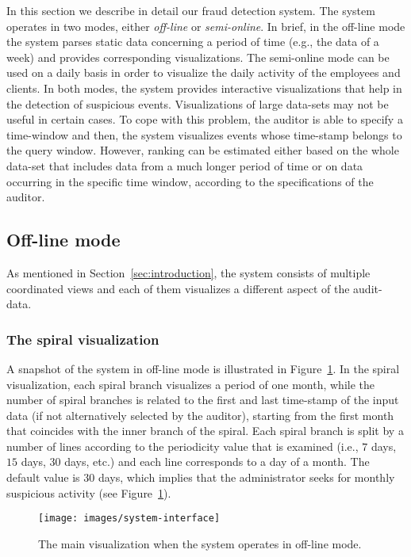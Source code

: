 \documentclass[conference]{IEEEtran}
\begin{document}
In this section we describe in detail our fraud detection system.
The system operates in two modes, either \emph{off-line} or
\emph{semi-online}. In brief, in the off-line mode the system parses
static data concerning a period of time (e.g., the data of a week)
and provides corresponding visualizations. The semi-online mode can
be used on a daily basis in order to visualize the daily activity of
the employees and clients. In both modes, the system provides
interactive visualizations that help in the detection of suspicious
events. Visualizations of large data-sets may not be useful in
certain cases. To cope with this problem, the auditor is able to
specify a time-window and then, the system visualizes events whose
time-stamp belongs to the query window. However, ranking can be
estimated either based on the whole data-set that includes data from
a much longer  period of time or on data occurring in the specific
time window, according to the specifications of the auditor.

\subsection{Off-line mode}

As mentioned in Section~\ref{sec:introduction}, the system consists
of multiple coordinated views and each of them visualizes a
different aspect of the audit-data.

\subsubsection{The spiral visualization}

A snapshot of the system in off-line mode is illustrated in
Figure~\ref{fig:system-interface}. In the spiral visualization, each
spiral branch visualizes a period of one month, while the number of
spiral branches is related to the first and last time-stamp of the
input data (if not alternatively selected by the auditor), starting
from the first month that coincides with the inner branch of the
spiral. Each spiral branch is split by a number of lines according
to the periodicity value that is examined (i.e., $7$ days, $15$
days, $30$ days, etc.) and each line corresponds to a day of a
month. The default value is $30$ days, which implies that the
administrator seeks for monthly suspicious activity (see
Figure~\ref{fig:system-interface}).

\begin{figure}[h!tb]
  \centering
  \texttt{[image: images/system-interface]}
  \caption{The main visualization when the system operates in off-line mode.}
  \label{fig:system-interface}
\end{figure}
\end{document}
